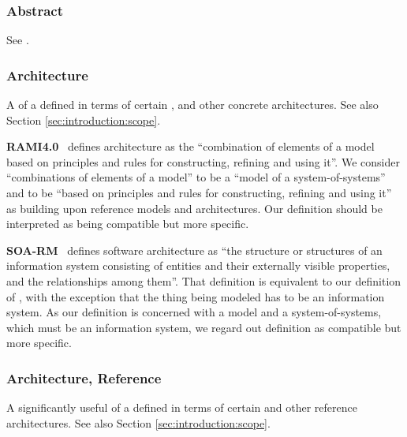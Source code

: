 {

\newcommand{\GlossaryEntry}[3][]{\subsubsection*{#3\IfStrEq{#1}{}{}{ {\normalfont \textit{#1}}}}\label{sec:glossary:#2}}
\newcommand{\GlossaryNote}[2]{\begin{minipage}[b]{\dimexpr\linewidth-0.5cm\relax}\vspace*{0.33cm}\footnotesize{\textbf{#1}\ #2}\end{minipage}}

\GlossaryEntry{abstract}{Abstract}
See .

\GlossaryEntry{architecture}{Architecture}
A  of a  defined in terms of certain ,  and other concrete architectures.
See also Section \ref{sec:introduction:scope}.

	\GlossaryNote{RAMI4.0}{
	    defines architecture as the ``combination of elements of a model based on principles and rules for constructing, refining and using it''.
		We consider ``combinations of elements of a model'' to be a ``model of a system-of-systems'' and to be ``based on principles and rules for constructing, refining and using it'' as building upon reference models and architectures.
		Our definition should be interpreted as being compatible but more specific.
	}

	\GlossaryNote{SOA-RM}{
		defines software architecture as ``the structure or structures of an information system consisting of entities and their externally visible properties, and the relationships among them''.
		That definition is equivalent to our definition of \GlossaryHyperRef{model}{model}, with the exception that the thing being modeled has to be an information system.
		As our definition is concerned with a model and a system-of-systems, which must be an information system, we regard out definition as compatible but more specific.
	}

\GlossaryEntry{architecture-reference}{Architecture, Reference}
A significantly useful  of a  defined in terms of certain  and other reference architectures.
See also Section \ref{sec:introduction:scope}.

}
